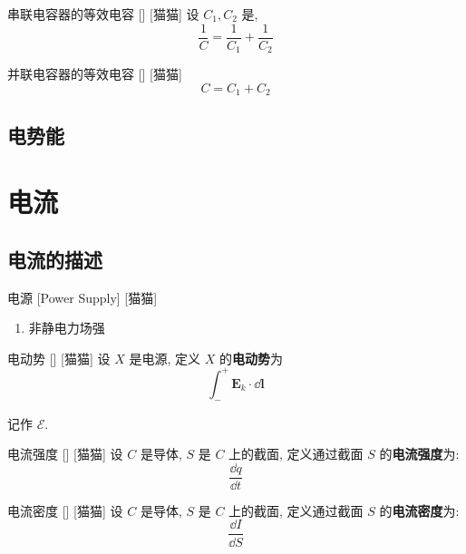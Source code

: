 \documentclass[UTF8]{ctexart}
\begin{document}
        \begin{ppt}
            []
            {串联电容器的等效电容}
            []
            [猫猫]
            设 \(C_1,C_2\) 是, 
            \[\frac{1}{C}=\frac{1}{C_1}+\frac{1}{C_2}\]
        \end{ppt}

        \begin{ppt}
            []
            {并联电容器的等效电容}
            []
            [猫猫]
            \[C=C_1+C_2\]
        \end{ppt}

    \subsection{电势能}

\section{电流}

    \subsection{电流的描述}
        
        \begin{dfn}
            {电源}
            [Power Supply]
            [猫猫]
            \begin{enumerate}
                \item 非静电力场强
            \end{enumerate}
        \end{dfn}
        
        \begin{dfn}
            []
            {电动势}
            []
            [猫猫]
            设 \(X\) 是电源, 定义 \(X\) 的\textbf{电动势}为
            \[\int_{-}^{+}\bm{E}_k\cdot\dd\bm{l}\]

            记作 \(\mathscr{E}\). 
        \end{dfn}

        \begin{dfn}
            []
            {电流强度}
            []
            [猫猫]
            设 \(C\) 是导体, \(S\) 是 \(C\) 上的截面, 定义通过截面 \(S\) 的\textbf{电流强度}为: 
            \[\frac{\dd q}{\dd t}\]
        \end{dfn}
        
        \begin{dfn}
            []
            {电流密度}
            []
            [猫猫]
            设 \(C\) 是导体, \(S\) 是 \(C\) 上的截面, 定义通过截面 \(S\) 的\textbf{电流密度}为: 
            \[\frac{\dd I}{\dd S}\]
        \end{dfn}
\end{document}
